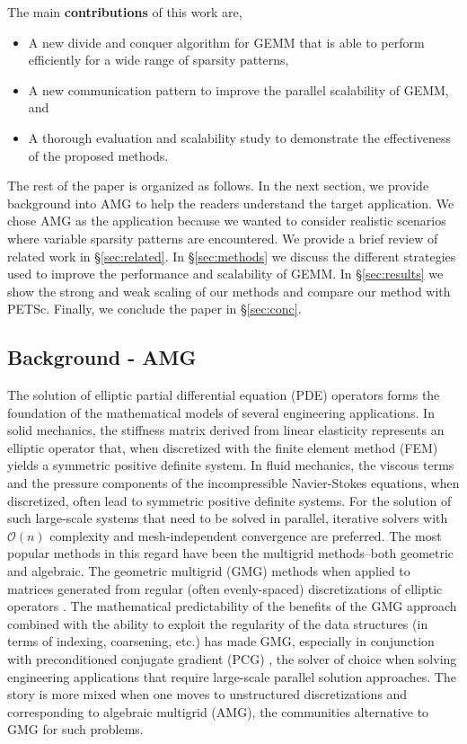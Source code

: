 The main {\bf contributions} of this work are,
\begin{itemize}
  \item A new divide and conquer algorithm for \textsc{GEMM} that is able to perform efficiently for a wide range of sparsity patterns,
  \item A new communication pattern to improve the parallel scalability of \textsc{GEMM}, and
  \item A thorough evaluation and scalability study to demonstrate the effectiveness of the proposed methods.
\end{itemize}

The rest of the paper is organized as follows. In the next section, we provide background into AMG to help the readers understand the target application. We chose AMG as the application because we wanted to consider realistic scenarios where variable sparsity patterns are encountered. We provide a brief review of related work in \S\ref{sec:related}.  In \S\ref{sec:methods} we discuss the different strategies used to improve the performance and scalability of \textsc{GEMM}. In \S\ref{sec:results} we show the strong and weak scaling of our methods and compare our method with PETSc. Finally, we conclude the paper in \S\ref{sec:conc}.

\subsection{Background - AMG}
\label{sec:bg}


The solution of elliptic partial differential equation (PDE) operators forms the 
foundation of the mathematical models of several engineering applications.
In solid mechanics, the stiffness matrix derived from linear elasticity represents an elliptic
operator that, when discretized with the finite element method (FEM) yields a symmetric positive
definite system. In fluid mechanics, the viscous terms and the pressure components of
the incompressible Navier-Stokes equations, when discretized, often lead to symmetric
positive definite systems. 
For the solution of such large-scale systems that need to be solved in parallel, iterative solvers 
with $\mathcal{O}(n)$ complexity and mesh-independent convergence are preferred. 
%
The most popular methods in this regard have been the multigrid methods--both geometric and algebraic. 
The geometric multigrid (GMG) methods when applied
to matrices generated from regular (often evenly-spaced) discretizations of elliptic operators \cite{MadayMunoz88,BrambleZhang00,Brenner02,GholamiMalhotraSundar2016}.
The mathematical predictability of the benefits of the GMG approach combined with the ability to
exploit the regularity of the data structures (in terms of indexing, coarsening, etc.) has made
GMG, especially in conjunction with preconditioned conjugate gradient (PCG) \cite{Braess86,TatebeOyanagi94}, the solver of choice when solving engineering applications that require large-scale
parallel solution approaches.  The story is more mixed when one moves to unstructured discretizations
and corresponding to algebraic multigrid (AMG), the communities alternative to GMG for such problems.  

